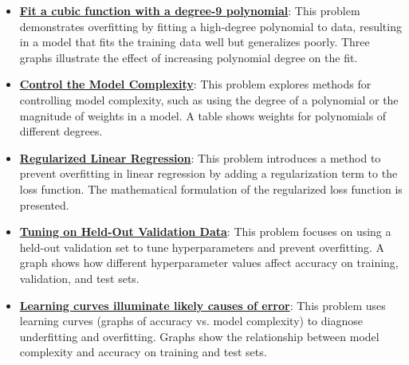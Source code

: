 \documentclass{article}%
\begin{document}
\begin{itemize}[leftmargin=*]
\item \href{https://purdue.brightspace.com/d2l/common/assets/pdfjs-d2l-dist/1.0.14-legacy/web/viewer.html?file=\%2Fcontent\%2Fenforced\%2F1095467-wl.202510.CS.24300.001\%2F10L1-CrossValidation.pdf\%3Fou\%3D1095467\&lang=en-us\&container=d2l-fileviewer-rendered-pdf\&fullscreen=d2l-fileviewer-rendered-pdf-dialog\&height=667#page=15}{\textbf{Fit a cubic function with a degree{-}9 polynomial}}: This problem demonstrates overfitting by fitting a high-degree polynomial to data, resulting in a model that fits the training data well but generalizes poorly. Three graphs illustrate the effect of increasing polynomial degree on the fit.%
\item \href{https://purdue.brightspace.com/d2l/common/assets/pdfjs-d2l-dist/1.0.14-legacy/web/viewer.html?file=\%2Fcontent\%2Fenforced\%2F1095467-wl.202510.CS.24300.001\%2F10L1-CrossValidation.pdf\%3Fou\%3D1095467\&lang=en-us\&container=d2l-fileviewer-rendered-pdf\&fullscreen=d2l-fileviewer-rendered-pdf-dialog\&height=667#page=16}{\textbf{Control the Model Complexity}}: This problem explores methods for controlling model complexity, such as using the degree of a polynomial or the magnitude of weights in a model. A table shows weights for polynomials of different degrees.%
\item \href{https://purdue.brightspace.com/d2l/common/assets/pdfjs-d2l-dist/1.0.14-legacy/web/viewer.html?file=\%2Fcontent\%2Fenforced\%2F1095467-wl.202510.CS.24300.001\%2F10L1-CrossValidation.pdf\%3Fou\%3D1095467\&lang=en-us\&container=d2l-fileviewer-rendered-pdf\&fullscreen=d2l-fileviewer-rendered-pdf-dialog\&height=667#page=17}{\textbf{Regularized Linear Regression}}: This problem introduces a method to prevent overfitting in linear regression by adding a regularization term to the loss function. The mathematical formulation of the regularized loss function is presented.%
\item \href{https://purdue.brightspace.com/d2l/common/assets/pdfjs-d2l-dist/1.0.14-legacy/web/viewer.html?file=\%2Fcontent\%2Fenforced\%2F1095467-wl.202510.CS.24300.001\%2F10L1-CrossValidation.pdf\%3Fou\%3D1095467\&lang=en-us\&container=d2l-fileviewer-rendered-pdf\&fullscreen=d2l-fileviewer-rendered-pdf-dialog\&height=667#page=19}{\textbf{Tuning on Held{-}Out Validation Data}}: This problem focuses on using a held-out validation set to tune hyperparameters and prevent overfitting. A graph shows how different hyperparameter values affect accuracy on training, validation, and test sets.%
\item \href{https://purdue.brightspace.com/d2l/common/assets/pdfjs-d2l-dist/1.0.14-legacy/web/viewer.html?file=\%2Fcontent\%2Fenforced\%2F1095467-wl.202510.CS.24300.001\%2F10L1-CrossValidation.pdf\%3Fou\%3D1095467\&lang=en-us\&container=d2l-fileviewer-rendered-pdf\&fullscreen=d2l-fileviewer-rendered-pdf-dialog\&height=667#page=20}{\textbf{Learning curves illuminate likely causes of error}}: This problem uses learning curves (graphs of accuracy vs. model complexity) to diagnose underfitting and overfitting. Graphs show the relationship between model complexity and accuracy on training and test sets.%

\end{itemize}
\end{document}
